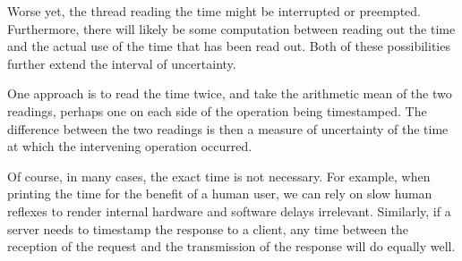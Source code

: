 Worse yet, the thread reading the time might be interrupted or preempted.
Furthermore, there will likely be some computation between reading out
the time and the actual use of the time that has been read out.
Both of these possibilities further extend the interval of uncertainty.

One approach is to read the time twice, and take the arithmetic mean
of the two readings, perhaps one on each side of the operation being
timestamped.
The difference between the two readings is then a measure of uncertainty
of the time at which the intervening operation occurred.

Of course, in many cases, the exact time is not necessary.
For example, when printing the time for the benefit of a human user,
we can rely on slow human reflexes to render internal hardware and
software delays irrelevant.
Similarly, if a server needs to timestamp the response to a client, any
time between the reception of the request and the transmission of the
response will do equally well.






